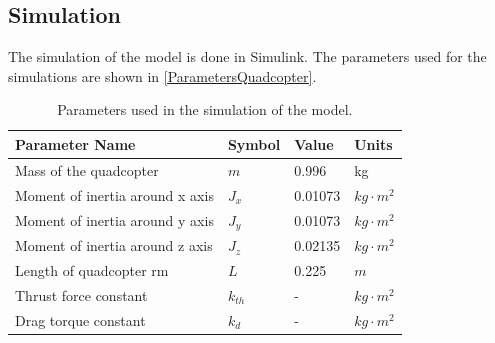 \subsection{Simulation}
The simulation of the model is done in Simulink. The parameters used for the simulations are shown in \autoref{ParametersQuadcopter}.
\begin{table}[H]
	\centering
	\begin{tabular}{|l|l|l|p{3cm}|}
		\hline %
		\textbf{Parameter Name}&\textbf{Symbol} &\textbf{Value} &\textbf{Units}\\
		\hline %
		Mass of the quadcopter  & $m$ & 0.996       &kg\\
		\hline
		Moment of inertia around x axis       & $J_x$  & 0.01073       & $kg \cdot m^2$\\
		\hline %
		Moment of inertia around y axis       & $J_y$  & 0.01073       & $kg \cdot m^2$\\
		\hline %
		Moment of inertia around z axis       & $J_z$  & 0.02135       & $kg \cdot m^2$\\
		\hline %
		Length of quadcopter rm       & $L$  &   0.225       & $m$\\
		\hline %
		Thrust force constant       & $k_{th}$  & -       & $kg \cdot m^2$\\
		\hline %
		Drag torque constant      & $k_{d}$  & -       & $kg \cdot m^2$\\
		\hline %
	\end{tabular}
	\caption{Parameters used in the simulation of the model.}
	\label{ParametersQuadcopter}
\end{table}\vspace{-18pt}

